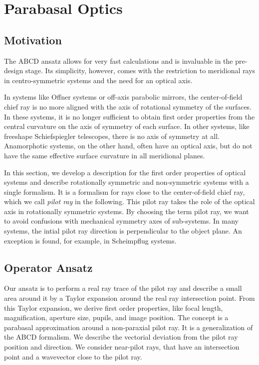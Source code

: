 \documentclass[12pt,a4paper,twoside,openright,BCOR10mm,headsepline,titlepage,abstracton,chapterprefix,final]{scrreprt}
\begin{document}
\section{Parabasal Optics} \label{sec:ParabasalOptics}

\subsection{Motivation}

The ABCD ansatz allows for very fast calculations and is invaluable in the pre-design stage.
Its simplicity, however, comes with the restriction to meridional rays in centro-symmetric systems and the need for an optical axis.

In systems like Offner systems or off-axis parabolic mirrors, the center-of-field chief ray is no more aligned with the axis of rotational symmetry of the surfaces.
In these systems, it is no longer sufficient to obtain first order properties from the central curvature on the axis of symmetry of each surface.
In other systems, like freeshape Schiefspiegler telescopes, there is no axis of symmetry at all. 
Anamorphotic systems, on the other hand, often have an optical axis, but do not have the same effective surface curvature in all meridional planes.

In this section, we develop a description for the first order properties of optical systems 
and describe rotationally symmetric and non-symmetric systems with a single formalism.
It is a formalism for rays close to the center-of-field chief ray, which we call \emph{pilot ray} in the following.
This pilot ray takes the role of the optical axis in rotationally symmetric systems. 
By choosing the term pilot ray, we want to avoid confusions with mechanical symmetry axes of sub-systems.
In many systems, the intial pilot ray direction is perpendicular to the object plane. 
An exception is found, for example, in Scheimpflug systems.

\subsection{Operator Ansatz}
Our ansatz is to perform a real ray trace of the pilot ray and describe a small area around it by a Taylor expansion around the real ray intersection point.
From this Taylor expansion, we derive first order properties, like focal length, magnification, aperture size, pupils, and image position.
The concept is a parabasal approximation around a non-paraxial pilot ray.
It is a generalization of the ABCD formalism. 
We describe the vectorial deviation from the pilot ray position and direction.
We consider near-pilot rays, that have an intersection point and a wavevector close to the pilot ray.
\end{document}
